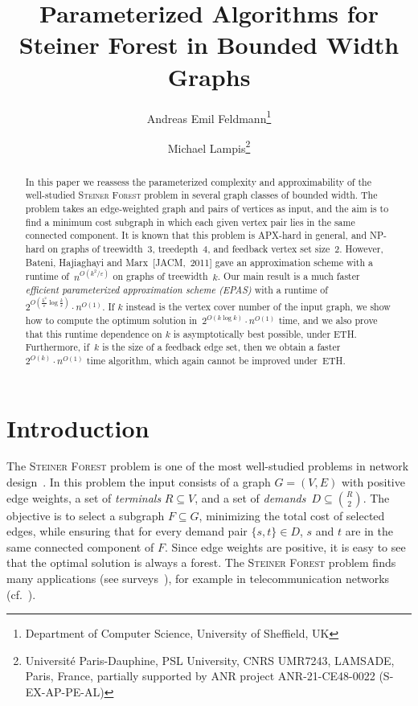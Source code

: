 \documentclass[a4paper]{article}
\title{Parameterized Algorithms for\\
Steiner Forest in Bounded Width Graphs}
\author{Andreas Emil Feldmann\thanks{Department of Computer Science, University 
of Sheffield, UK}
\and
Michael Lampis\thanks{Universit\'{e} Paris-Dauphine, PSL University, CNRS 
UMR7243, LAMSADE, Paris, France, partially supported by ANR project 
ANR-21-CE48-0022 (S-EX-AP-PE-AL)}
}
\date{}
\theoremstyle{plain}
\newcommand{\eps}{{\varepsilon}}
\newcommand{\pname}[1]{\textsc{#1}}
\newcommand{\SF}{\pname{Steiner Forest}\xspace}
\begin{document}
\maketitle
%

\begin{abstract}

In this paper we reassess the parameterized complexity and approximability of
the well-studied \SF problem in several graph classes of bounded width. The
problem takes an edge-weighted graph and pairs of vertices as input, and the
aim is to find a minimum cost subgraph in which each given vertex pair lies in
the same connected component.  It is known that this problem is APX-hard in
general, and NP-hard on graphs of treewidth~3, treedepth~4, and feedback vertex
set size~2. However, Bateni, Hajiaghayi and Marx~[JACM,~2011] gave an approximation scheme
with a runtime of~$n^{O(k^2/\eps)}$ on graphs of treewidth~$k$. Our main result
is a much faster \emph{efficient parameterized approximation scheme (EPAS)}
with a runtime of~$2^{O(\frac{k^2}{\eps}\log\frac{k}{\eps})}\cdot n^{O(1)}$. If
$k$ instead is the vertex cover number of the input graph, we show how to
compute the optimum solution in~$2^{O(k\log k)}\cdot n^{O(1)}$ time, and we
also prove that this runtime dependence on $k$ is asymptotically best possible,
under ETH.  Furthermore, if~$k$ is the size of a feedback edge set, then we
obtain a faster~$2^{O(k)}\cdot n^{O(1)}$ time algorithm, which again cannot be
improved under~ETH.

\end{abstract}

%
%
%
%
%
%
%
%
%
%
%
%
%
%
%
%
%

\section{Introduction}

The \SF problem is one of the most well-studied problems in network
design~\cite{ljubic2021solving, hwang1992steiner, du2013advances,
gupta2011approximation}. In this problem the input consists of a graph
$G=(V,E)$ with positive edge weights, %
a set of \emph{terminals} $R\subseteq V$, and a set of
\emph{demands}~$D\subseteq\binom{R}{2}$. The objective is to select a subgraph
$F\subseteq G$, minimizing the total cost of selected edges, while ensuring that for every
demand pair $\{s,t\}\in D$, $s$ and $t$ are in the same connected component of
$F$.  Since edge weights are positive, it is easy to see that the optimal
solution is always a forest. The \SF problem finds many applications (see
surveys~\cite{ljubic2021solving, cheng2013steiner, voss2006steiner,
tang2020survey}), for example in telecommunication networks
(cf.~\cite{voss2006steiner}). 
\end{document}
